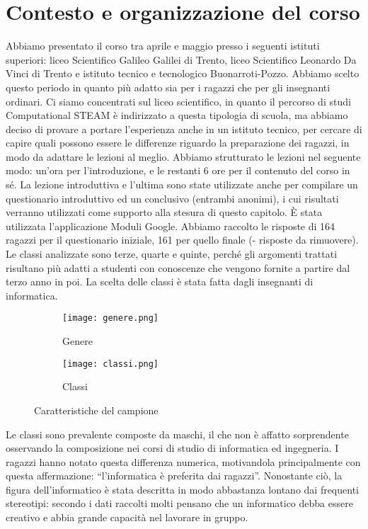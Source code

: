 \section{Contesto e organizzazione del corso}
Abbiamo presentato il corso tra aprile e maggio presso i seguenti istituti superiori: liceo Scientifico Galileo Galilei di Trento, liceo Scientifico Leonardo Da Vinci di Trento e istituto tecnico e tecnologico Buonarroti-Pozzo. Abbiamo scelto questo periodo in quanto più adatto sia per i ragazzi che per gli insegnanti ordinari. Ci siamo concentrati sul liceo scientifico, in quanto il percorso di studi Computational STEAM è indirizzato a questa tipologia di scuola, ma abbiamo deciso di provare a portare l’esperienza anche in un istituto tecnico, per cercare di capire quali possono essere le differenze riguardo la preparazione dei ragazzi, in modo da adattare le lezioni al meglio. Abbiamo strutturato le lezioni nel seguente modo: un’ora per l’introduzione, e le restanti 6 ore per il contenuto del corso in sé. La lezione introduttiva e l’ultima sono state utilizzate anche per compilare un questionario introduttivo ed un conclusivo (entrambi anonimi), i cui risultati verranno utilizzati come supporto alla stesura di questo capitolo. È stata utilizzata l’applicazione Moduli Google. Abbiamo raccolto le risposte di 164 ragazzi per il questionario iniziale, 161 per quello finale (- risposte da rimuovere).
Le classi analizzate sono terze, quarte e quinte, perché gli argomenti trattati risultano più adatti a studenti con conoscenze che vengono fornite a partire dal terzo anno in poi. La scelta delle classi è stata fatta dagli insegnanti di informatica. 
\begin{figure}[h!]
    \begin{subfigure}{.5\textwidth}
        \centering
        \texttt{[image: genere.png]}
        \caption{Genere}
        \label{fig:genere}
    \end{subfigure}
    \begin{subfigure}{.5\textwidth}
        \centering
        \texttt{[image: classi.png]}
        \caption{Classi}
        \label{fig:classi}
    \end{subfigure}
    \caption{Caratteristiche del campione} 
\end{figure}
Le classi sono prevalente composte da maschi, il che non è affatto sorprendente osservando la composizione nei corsi di studio di informatica ed ingegneria. I ragazzi hanno notato questa differenza numerica, motivandola principalmente con questa affermazione: “l'informatica è preferita dai ragazzi”. Nonostante ciò, la figura dell’informatico è stata descritta in modo abbastanza lontano dai frequenti stereotipi: secondo i dati raccolti molti pensano che un informatico debba essere creativo e abbia grande capacità nel lavorare in gruppo. 

